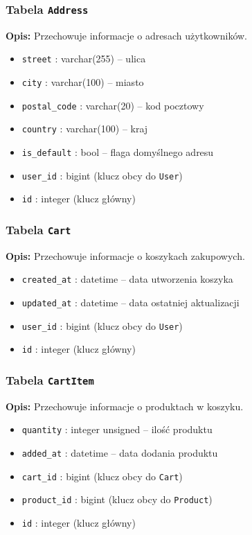 \documentclass[12pt,a4paper,oneside]{article}
\theoremstyle{definition}
\numberwithin{equation}{section}
\begin{document}
\subsubsection*{Tabela \texttt{Address}}
\textbf{Opis:} Przechowuje informacje o adresach użytkowników.
\begin{itemize}
    \item \texttt{street} : varchar(255) – ulica
    \item \texttt{city} : varchar(100) – miasto
    \item \texttt{postal\string_code} : varchar(20) – kod pocztowy
    \item \texttt{country} : varchar(100) – kraj
    \item \texttt{is\string_default} : bool – flaga domyślnego adresu
    \item \texttt{user\string_id} : bigint (klucz obcy do \texttt{User})
    \item \texttt{id} : integer (klucz główny)
\end{itemize}

\subsubsection*{Tabela \texttt{Cart}}
\textbf{Opis:} Przechowuje informacje o koszykach zakupowych.
\begin{itemize}
    \item \texttt{created\string_at} : datetime – data utworzenia koszyka
    \item \texttt{updated\string_at} : datetime – data ostatniej aktualizacji
    \item \texttt{user\string_id} : bigint (klucz obcy do \texttt{User})
    \item \texttt{id} : integer (klucz główny)
\end{itemize}

\subsubsection*{Tabela \texttt{CartItem}}
\textbf{Opis:} Przechowuje informacje o produktach w koszyku.
\begin{itemize}
    \item \texttt{quantity} : integer unsigned – ilość produktu
    \item \texttt{added\string_at} : datetime – data dodania produktu
    \item \texttt{cart\string_id} : bigint (klucz obcy do \texttt{Cart})
    \item \texttt{product\string_id} : bigint (klucz obcy do \texttt{Product})
    \item \texttt{id} : integer (klucz główny)
\end{itemize}
\end{document}
